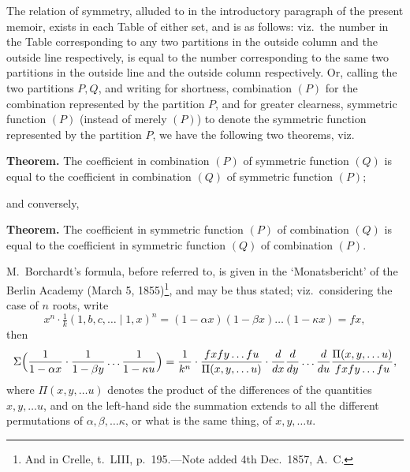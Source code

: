 \documentclass[11pt]{article}
\begin{document}
The relation of symmetry, alluded to in the introductory paragraph of the present memoir, exists in each Table of either set, and is as follows: viz.\ the number in the Table corresponding to any two partitions in the outside column and the outside line respectively, is equal to the number corresponding to the same two partitions in the outside line and the outside column respectively. Or, calling the two partitions $P, Q$, and writing for shortness, combination $(P)$ for the combination represented by the partition $P$, and for greater clearness, symmetric function $(P)$ (instead of merely $(P)$) to denote the symmetric function represented by the partition $P$, we have the following two theorems, viz.

\medskip

\noindent\textbf{Theorem.} The coefficient in combination $(P)$ of symmetric function $(Q)$ is equal to the coefficient in combination $(Q)$ of symmetric function $(P)$;

and conversely,

\medskip

\noindent\textbf{Theorem.} The coefficient in symmetric function $(P)$ of combination $(Q)$ is equal to the coefficient in symmetric function $(Q)$ of combination $(P)$.

\medskip

M.~Borchardt's formula, before referred to, is given in the `Monatsbericht' of the Berlin Academy (March 5, 1855)\footnote{And in Crelle, t.~LIII, p.~195.---Note added 4th Dec.\ 1857, A.~C.}, and may be thus stated; viz.\ considering the case of $n$ roots, write
\[
x^n \cdot \tfrac{1}{k}(1, b, c, \ldots \mid 1, x)^n = (1 - \alpha x)(1 - \beta x)\ldots(1 - \kappa x) = f x,
\]
then
\[
\Sigma\Bigl(\frac{1}{1 - \alpha x}\cdot\frac{1}{1 - \beta y}\ldots\frac{1}{1 - \kappa u}\Bigr) = \frac{1}{k^n}\cdot\frac{f x f y \ldots f u}{\Pi(x, y, \ldots u)}\cdot\frac{d}{dx}\frac{d}{dy}\ldots\frac{d}{du}\frac{\Pi(x, y, \ldots u)}{f x f y \ldots f u},
\]
where $\Pi(x, y, \ldots u)$ denotes the product of the differences of the quantities $x, y, \ldots u$, and on the left-hand side the summation extends to all the different permutations of $\alpha, \beta, \ldots\kappa$, or what is the same thing, of $x, y, \ldots u$.
\end{document}
